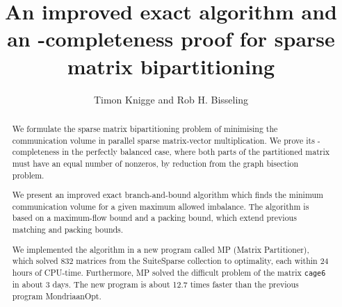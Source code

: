 \documentclass{article}
\title{An improved exact algorithm and an \NP-completeness proof for sparse matrix bipartitioning}
\author{Timon Knigge and Rob H. Bisseling}
\begin{document}
	\maketitle

	\begin{abstract}
		We formulate the sparse matrix bipartitioning problem of
		minimising the communication volume in parallel sparse
		matrix-vector multiplication. We prove its \NP-completeness
		in the perfectly balanced case, where both parts of the
		partitioned matrix must have an equal number of nonzeros,
		by reduction from the graph bisection problem.

		We present an improved exact branch-and-bound algorithm
		which finds the minimum communication volume for a given
		maximum allowed imbalance. The algorithm is based on a
		maximum-flow bound and a packing bound, which extend
		previous matching and packing bounds.

		We implemented the algorithm in a new program called MP
		(Matrix Partitioner), which solved 832 matrices from the
		SuiteSparse collection to optimality, each within 24 hours
		of CPU-time. Furthermore, MP solved the difficult problem
		of the matrix \texttt{cage6} in about 3 days. The new
		program is about 12.7 times faster than the previous program
		MondriaanOpt.
	\end{abstract}

	
	
	
	
	
	

	
	
\end{document}
